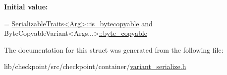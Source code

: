 {\bfseries Initial value\+:}
\begin{DoxyCode}
=
    \hyperlink{structcheckpoint_1_1_serializable_traits_a19e58ea0f510be10502e476258ed14ae}{SerializableTraits<Arg>::is\_bytecopyable} and
    ByteCopyableVariant<Args...>\hyperlink{structcheckpoint_1_1detail_1_1_byte_copyable_variant_3_01_arg_00_01_args_8_8_8_01_4_aad927b3301c6fe1b4b61b2c86232c449}{::byte\_copyable}
\end{DoxyCode}


The documentation for this struct was generated from the following file\+:\begin{DoxyCompactItemize}
\item 
lib/checkpoint/src/checkpoint/container/\hyperlink{variant__serialize_8h}{variant\+\_\+serialize.\+h}\end{DoxyCompactItemize}
